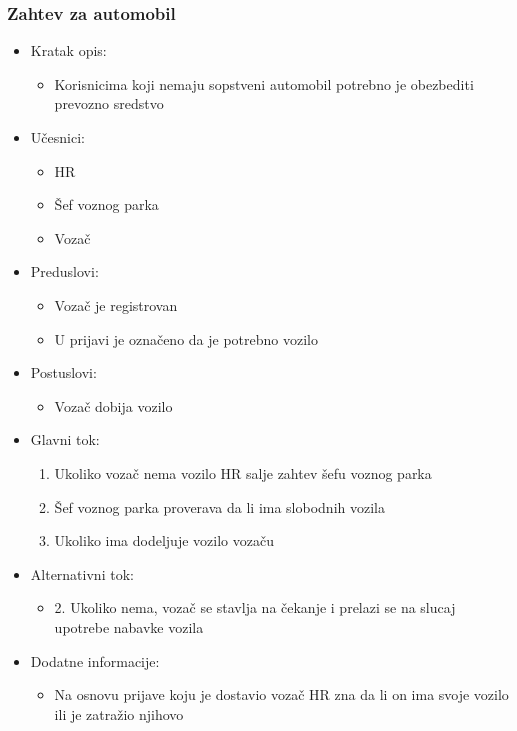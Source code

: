 \subsubsection{\bfseries Zahtev za automobil}
\begin{itemize}
	\item Kratak opis:
		\begin{itemize}
			\item Korisnicima koji nemaju sopstveni automobil potrebno je obezbediti prevozno sredstvo		
		\end{itemize}

	\item Učesnici:
		\begin{itemize}
		    \item HR
		    \item Šef voznog parka
		    \item Vozač
		\end{itemize}


	\item Preduslovi:
		\begin{itemize}
		    \item Vozač je registrovan
		    \item U prijavi je označeno da je potrebno vozilo
		\end{itemize}


	\item Postuslovi:
		\begin{itemize}
			\item Vozač dobija vozilo
	\end{itemize}

	\item Glavni tok:
		\begin{enumerate}
		    \item Ukoliko vozač nema vozilo HR salje zahtev šefu voznog parka
		    \item Šef voznog parka proverava da li ima slobodnih vozila
		    \item Ukoliko ima dodeljuje vozilo vozaču
		\end{enumerate}

	\item Alternativni tok:
		\begin{itemize}
		    \item 2. Ukoliko nema, vozač se stavlja na čekanje i prelazi se na slucaj upotrebe nabavke vozila
		\end{itemize}

	\item Dodatne informacije:
		\begin{itemize}
			\item Na osnovu prijave koju je dostavio vozač HR zna da li on ima svoje vozilo ili je zatražio njihovo
		\end{itemize}

\end{itemize}



